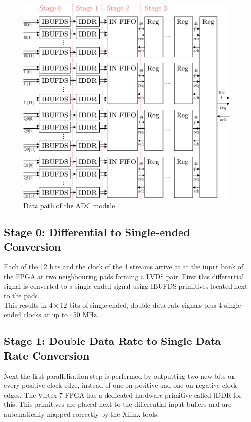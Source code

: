 \begin{figure}[ht]
  \centering
  \includegraphics[width=\textwidth]{figures/fpga_adc}
  \caption{Data path of the \gls{ADC} module}
  \label{fig:fpga_adc}
\end{figure}

\subsection{Stage 0: Differential to Single-ended Conversion}
Each of the 12 bits and the clock of the 4 streams arrive at at the input bank
of the \gls{FPGA} at two neighbouring pads forming a \gls{LVDS} pair.
First this differential signal is converted to a single ended signal using
\gls{IBUFDS} primitives located next
to the pads. \\

This results in $4 \times 12$ bits of single ended, double data rate
signals plus 4 single ended clocks at up to 450 MHz. \\

\subsection{Stage 1: Double Data Rate to Single Data Rate Conversion}
\label{sec:fpga_adc_s1}
Next the first parallelisation step is performed by outputting two new
bits on every positive clock edge, instead of one on positive and one on
negative clock edges. The Virtex-7 \gls{FPGA} has a dedicated hardware
primitive called \gls{IDDR} for this.
This primitives are placed next to the differential input buffers
and are automatically mapped correctly by the Xilinx tools. \\

